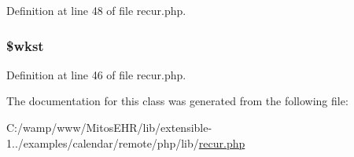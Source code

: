\-Definition at line 48 of file recur.\-php.

\hypertarget{class_when_a28f081d50521dd1e40a5c50ef3375bad}{
\subsubsection[{\$wkst}]{\setlength{\rightskip}{0pt plus 5cm}\${\bf wkst}}}\label{class_when_a28f081d50521dd1e40a5c50ef3375bad}


\-Definition at line 46 of file recur.\-php.



\-The documentation for this class was generated from the following file\-:\begin{DoxyCompactItemize}
\item 
\-C\-:/wamp/www/\-Mitos\-E\-H\-R/lib/extensible-\/1../examples/calendar/remote/php/lib/\hyperlink{recur_8php}{recur.\-php}\end{DoxyCompactItemize}
